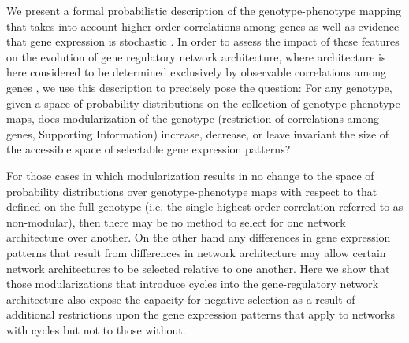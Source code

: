 
We present a formal probabilistic description of the genotype-phenotype mapping that takes into account higher-order correlations among genes as well as evidence that gene expression is stochastic \cite{Swain2002,Paulsson2004,Thattai2004,Acar2008a,Lestas2010,So2011,Munsky2012,Neuert2013,Sanchez2013}. In order to assess the impact of these features on the evolution of gene regulatory network architecture, where architecture is here considered to be determined exclusively by observable correlations among genes \cite{Friedman2008a}, we use this description to precisely pose the question: For any genotype, given a space of probability distributions on the collection of genotype-phenotype maps, does modularization of the genotype (restriction of correlations among genes, Supporting Information) increase, decrease, or leave invariant the size of the accessible space of selectable gene expression patterns?

For those cases in which modularization results in no change to the space of probability distributions over genotype-phenotype maps with respect to that defined on the full genotype (i.e. the single highest-order correlation referred to as non-modular), then there may be no method to select for one network architecture over another. On the other hand any differences in gene expression patterns that result from differences in network architecture may allow certain network architectures to be selected relative to one another. Here we show that those modularizations that introduce cycles into the gene-regulatory network architecture also expose the capacity for negative selection as a result of additional restrictions upon the gene expression patterns that apply to networks with cycles but not to those without.

